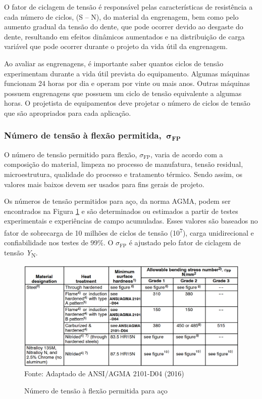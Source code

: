 \documentclass[12pt,a4paper]{article}
\begin{document}
O fator de ciclagem de tensão é responsável pelas características de
resistência a cada número de ciclos, (S -- N), do material da
engrenagem, bem como pelo aumento gradual da tensão do dente, que pode
ocorrer devido ao desgaste do dente, resultando em efeitos dinâmicos
aumentados e na distribuição de carga variável que pode ocorrer durante
o projeto da vida útil da engrenagem.

Ao avaliar as engrenagens, é importante saber quantos ciclos de tensão
experimentam durante a vida útil prevista do equipamento. Algumas
máquinas funcionam 24 horas por dia e operam por vinte ou mais anos.
Outras máquinas possuem engrenagens que possuem um ciclo de tensão
equivalente a algumas horas. O projetista de equipamentos deve projetar
o número de ciclos de tensão que são apropriados para cada aplicação.

\subsubsection*{Número de tensão à flexão
permitida,~\(\mathbf{\sigma}_{\mathbf{\text{FP}}}\)}

{\label{nuxfamero-de-tensuxe3o-uxe0-flexuxe3o-permitida-mathbfsigma_mathbftextfp}}

O número de tensão permitido para flexão, $\sigma_{\text{FP}}$, varia de acordo com a composição do
material, limpeza no processo de manufatura, tensão residual,
microestrutura, qualidade do processo e tratamento térmico. Sendo assim,
os valores mais baixos devem ser usados para fins gerais de projeto.

Os números de tensão permitidos para aço, da norma AGMA, podem ser
encontrados na Figura {\ref{fig:27}} e são determinados
ou estimados a partir de testes experimentais e experiências de campo
acumuladas. Esses valores são baseados no fator de sobrecarga de 10
milhões de ciclos de tensão (10\textsuperscript{7}), carga unidirecional
e confiabilidade nos testes de 99\%. O $\sigma_{\text{FP}}$ é ajustado pelo fator de ciclagem de tensão \emph{Y}\textsubscript{N}.

\begin{figure}[!htb]
    \centering
    \caption{Número de tensão à flexão permitida para aço}
    \includegraphics[scale=0.46]{Imagens/Img27.png}\\
    {\footnotesize Fonte: Adaptado de ANSI/AGMA 2101-D04 (2016)}
    \label{fig:27}
\end{figure}
\end{document}
